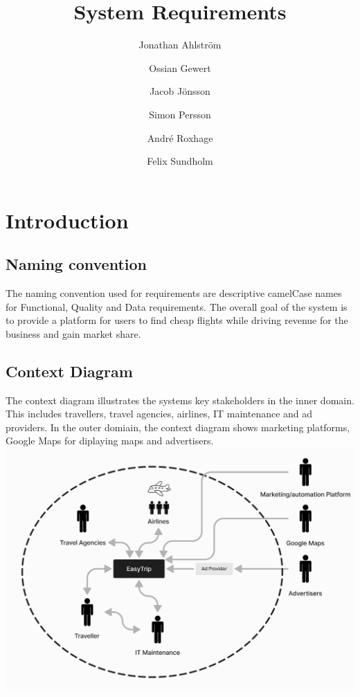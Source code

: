 \documentclass[a4paper]{article}
\title{System Requirements}
\author{Jonathan Ahlström \and Ossian Gewert \and Jacob Jönsson \and Simon Persson \and André Roxhage \and Felix Sundholm}
\begin{document}
\maketitle

\begin{center}
    
\end{center}

\newpage
\tableofcontents
\newpage

\section{Introduction}
\subsection{Naming convention}
The naming convention used for requirements are descriptive camelCase names for Functional, Quality and Data requirements.
The overall goal of the system is to provide a platform for users to find cheap flights while driving revenue for the business and gain market share.

\subsection{Context Diagram}
The context diagram illustrates the systems key stakeholders in the inner domain. This includes travellers, travel agencies, airlines, IT maintenance and ad providers. In the outer domiain, the context diagram shows marketing platforms, Google Maps for diplaying maps and advertisers.
\includegraphics[width=.99\textwidth]{resources/contextDiagram.png}
\end{document}

